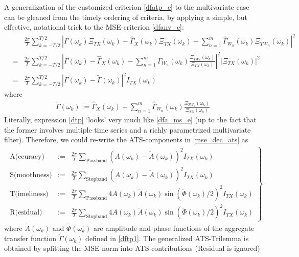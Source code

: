 \documentclass[a4paper]{book}
\begin{document}
A generalization of the customized criterion \ref{dfatp_e} to the multivariate case can  be gleaned from the timely ordering of criteria, by applying a simple, but effective, notational trick to the MSE-criterion \ref{dfanv_e}:
\begin{eqnarray}
\label{dfavtp}
&&\frac{2\pi}{T} \sum_{k=-T/2}^{T/2}
\left|\Gamma(\omega_k)\Xi_{TX}(\omega_k)-\hat{\Gamma}_X(\omega_k)\Xi_{TX}(\omega_k)-\sum_{n=1}^m\hat{\Gamma}_{W_n}(\omega_k)\Xi_{TW_n}(\omega_k)\right|^2 \nonumber \\
&=&\frac{2\pi}{T} \sum_{k=-T/2}^{T/2}
\left|\Gamma(\omega_k)-\hat{\Gamma}_X(\omega_k)-\sum_{n=1}^m\hat{\Gamma}_{W_n}(\omega_k)\frac{\Xi_{TW_n}(\omega_k)}{\Xi_{TX}(\omega_k)}\right|^2 \left|\Xi_{TX}(\omega_k)\right|^2 \nonumber\\
&=&\frac{2\pi}{T} \sum_{k=-T/2}^{T/2}
\left|\Gamma(\omega_k)-\tilde{\Gamma}(\omega_k)\right|^2 I_{TX}(\omega_k)\label{dtp}
\end{eqnarray}
where
\begin{eqnarray}\label{dftp1}
\tilde{\Gamma}(\omega_k):=\hat{\Gamma}_X(\omega_k)+\sum_{n=1}^m\hat{\Gamma}_{W_n}(\omega_k)\frac{\Xi_{TW_n}(\omega_k)}{\Xi_{TX}(\omega_k)}
\end{eqnarray}
Literally, expression \ref{dtp} `looks' very much like \ref{dfa_ms_e} (up to the fact that the former involves multiple time series and a richly parametrized multivariate filter). Therefore, we could re-write the ATS-components in \ref{mse_dec_ats} as 
\begin{eqnarray}
\left.\begin{array}{ccc}
\textrm{A(ccuracy)}&:=&\frac{2\pi}{ T} \sum_{\textrm{Passband}} (A(\omega_k)-\tilde{A}(\omega_k))^2 I_{TX}(\omega_k)\\
\textrm{S(moothness)}&:=&\frac{2\pi}{ T} \sum_{\textrm{Stopband}} (A(\omega_k)-\tilde{A}(\omega_k))^2 I_{TX}(\omega_k)\\
\textrm{T(imeliness)}&:=&\frac{2\pi}{ T}  \sum_{\textrm{Passband}} 4A(\omega_k)\tilde{A}(\omega_k)\sin(\tilde{\Phi}(\omega_k)/2)^2
I_{TX}(\omega_k)                                     \\
\textrm{R(esidual)}&:=&\frac{2\pi}{ T}  \sum_{\textrm{Stopband}} 4A(\omega_k)\tilde{A}(\omega_k)\sin(\tilde{\Phi}(\omega_k)/2)^2
I_{TX}(\omega_k)
\end{array}\right\}\label{mse_dec_ats_e}
\end{eqnarray}
where $\tilde{A}(\omega_k)$ and $\tilde{\Phi}(\omega_k)$ are amplitude and phase functions of the aggregate transfer function $\tilde{\Gamma}(\omega_k)$ defined in \ref{dftp1}. The generalized ATS-Trilemma is obtained by splitting the MSE-norm into ATS-contributions (Residual is ignored)
\end{document}
